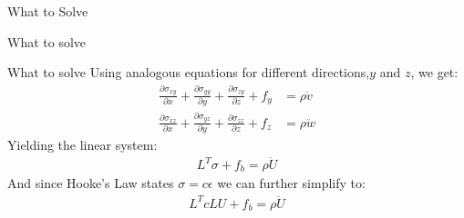 \documentclass{beamer}
\begin{document}
\begin{section}{What to Solve}
\begin{frame}{What to solve}
\end{frame}
\begin{frame}{What to solve}
    Using analogous equations for different directions,$y$ and $z$, we get:
    \begin{align*}
        \frac{\partial \sigma_{xy}}{\partial x} + \frac{\partial \sigma_{yy}}{\partial y} + \frac{\partial \sigma_{zy}}{\partial z} + f_y &= \rho \ddot{v} \\
        \frac{\partial \sigma_{xz}}{\partial x} + \frac{\partial \sigma_{yz}}{\partial y} + \frac{\partial \sigma_{zz}}{\partial z} + f_z &= \rho \ddot{w}
    \end{align*}
    Yielding the linear system:
    \begin{align}
        L^T\sigma + f_b = \rho \ddot{U}
    \end{align}
    And since Hooke's Law states $\sigma = c \epsilon$ we can further simplify to:
    \begin{align*}
        L^TcLU + f_b = \rho \ddot{U}
    \end{align*}
\end{frame}

    

\end{section}
\end{document}
